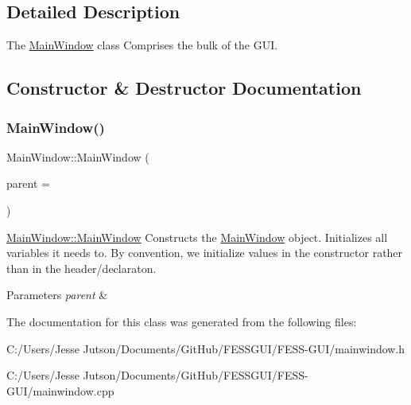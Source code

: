 \subsection{Detailed Description}
The \hyperlink{class_main_window}{Main\+Window} class Comprises the bulk of the G\+UI. 

\subsection{Constructor \& Destructor Documentation}
\hypertarget{class_main_window_a8b244be8b7b7db1b08de2a2acb9409db}{}\label{class_main_window_a8b244be8b7b7db1b08de2a2acb9409db} 
\subsubsection{\texorpdfstring{Main\+Window()}{MainWindow()}}
{\footnotesize\ttfamily Main\+Window\+::\+Main\+Window (\begin{DoxyParamCaption}\item[{Q\+Widget $\ast$}]{parent = {} }\end{DoxyParamCaption})\hspace{0.3cm}{\ttfamily [explicit]}}



\hyperlink{class_main_window_a8b244be8b7b7db1b08de2a2acb9409db}{Main\+Window\+::\+Main\+Window} Constructs the \hyperlink{class_main_window}{Main\+Window} object. Initializes all variables it needs to. By convention, we initialize values in the constructor rather than in the header/declaraton. 


\begin{DoxyParams}{Parameters}
{\em parent} & \\
\hline
\end{DoxyParams}


The documentation for this class was generated from the following files\+:\begin{DoxyCompactItemize}
\item 
C\+:/\+Users/\+Jesse Jutson/\+Documents/\+Git\+Hub/\+F\+E\+S\+S\+G\+U\+I/\+F\+E\+S\+S-\/\+G\+U\+I/mainwindow.\+h\item 
C\+:/\+Users/\+Jesse Jutson/\+Documents/\+Git\+Hub/\+F\+E\+S\+S\+G\+U\+I/\+F\+E\+S\+S-\/\+G\+U\+I/mainwindow.\+cpp\end{DoxyCompactItemize}
